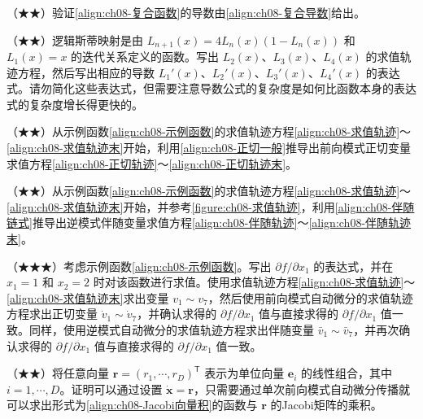\documentclass[../../main.tex]{subfiles}
\begin{document}
\begin{exercise}\label{exercise:ch08-13}
（★★）验证\eqref{align:ch08-复合函数}的导数由\eqref{align:ch08-复合导数}给出。
\end{exercise}

\begin{exercise}\label{exercise:ch08-14}
（★★）逻辑斯蒂映射是由 $L_{n+1}(x)=4L_n(x)\left(1-L_n(x)\right)$ 和 $L_1(x)=x$ 的迭代关系定义的函数。写出 $L_2(x)$、$L_3(x)$、$L_4(x)$ 的求值轨迹方程，然后写出相应的导数 $L_1'(x)$、$L_2'(x)$、$L_3'(x)$、$L_4'(x)$ 的表达式。请勿简化这些表达式，但需要注意导数公式的复杂度是如何比函数本身的表达式的复杂度增长得更快的。
\end{exercise}

\begin{exercise}\label{exercise:ch08-15}
（★★）从示例函数\eqref{align:ch08-示例函数}的求值轨迹方程\eqref{align:ch08-求值轨迹}～\eqref{align:ch08-求值轨迹末}开始，利用\eqref{align:ch08-正切一般}推导出前向模式正切变量求值方程\eqref{align:ch08-正切轨迹}～\eqref{align:ch08-正切轨迹末}。
\end{exercise}

\begin{exercise}\label{exercise:ch08-16}
（★★）从示例函数\eqref{align:ch08-示例函数}的求值轨迹方程\eqref{align:ch08-求值轨迹}～\eqref{align:ch08-求值轨迹末}开始，并参考\cref{figure:ch08-求值轨迹}，利用\eqref{align:ch08-伴随链式}推导出逆模式伴随变量求值方程\eqref{align:ch08-伴随轨迹}～\eqref{align:ch08-伴随轨迹末}。
\end{exercise}

\begin{exercise}\label{exercise:ch08-17}
（★★★）考虑示例函数\eqref{align:ch08-示例函数}。写出 $\partial f/\partial x_1$ 的表达式，并在 $x_1=1$ 和 $x_2=2$ 时对该函数进行求值。使用求值轨迹方程\eqref{align:ch08-求值轨迹}～\eqref{align:ch08-求值轨迹末}求出变量 $v_1\sim v_7$，然后使用前向模式自动微分的求值轨迹方程求出正切变量 $\dot{v}_1\sim\dot{v}_7$，并确认求得的 $\partial f/\partial x_1$ 值与直接求得的 $\partial f/\partial x_1$ 值一致。同样，使用逆模式自动微分的求值轨迹方程求出伴随变量 $\bar{v}_1\sim\bar{v}_7$，并再次确认求得的 $\partial f/\partial x_1$ 值与直接求得的 $\partial f/\partial x_1$ 值一致。
\end{exercise}

\begin{exercise}\label{exercise:ch08-18}
（★★）将任意向量 $\mathbf{r}=(r_1,\cdots,r_D)^{\mathsf T}$ 表示为单位向量 $\mathbf{e}_i$ 的线性组合，其中 $i=1,\cdots,D$。证明可以通过设置 $\dot{\mathbf{x}}=\mathbf{r}$，只需要通过单次前向模式自动微分传播就可以求出形式为\eqref{align:ch08-Jacobi向量积}的函数与 $\mathbf{r}$ 的Jacobi矩阵的乘积。
\end{exercise}
\end{document}

